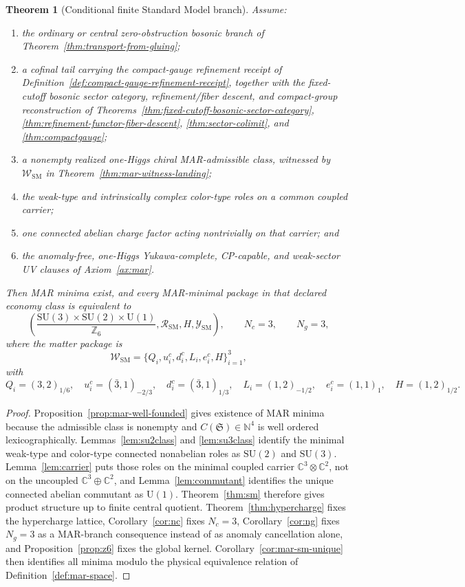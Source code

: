 \documentclass[11pt]{article}
\newtheorem{theorem}{Theorem}[section]
\newcommand{\SU}{\mathrm{SU}}
\newcommand{\U}{\mathrm{U}}
\begin{document}
\begin{theorem}[Conditional finite Standard Model branch]\label{thm:realized-sm-branch}
Assume:
\begin{enumerate}[label=\textup{(\arabic*)},leftmargin=2em]
\item the ordinary or central zero-obstruction bosonic branch of
Theorem~\ref{thm:transport-from-gluing};
\item a cofinal tail carrying the compact-gauge refinement receipt of
Definition~\ref{def:compact-gauge-refinement-receipt}, together with the fixed-cutoff bosonic sector category, refinement/fiber descent, and compact-group
reconstruction of Theorems~\ref{thm:fixed-cutoff-bosonic-sector-category},
\ref{thm:refinement-functor-fiber-descent}, \ref{thm:sector-colimit}, and
\ref{thm:compactgauge};
\item a nonempty realized one-Higgs chiral MAR-admissible class, witnessed by
\(\mathcal W_{\mathrm{SM}}\) in Theorem~\ref{thm:mar-witness-landing};
\item the weak-type and intrinsically complex color-type roles on a common coupled carrier;
\item one connected abelian charge factor acting nontrivially on that carrier; and
\item the anomaly-free, one-Higgs Yukawa-complete, CP-capable, and weak-sector UV clauses of
Axiom~\ref{ax:mar}.
\end{enumerate}
Then MAR minima exist, and every MAR-minimal package in that declared economy class is
equivalent to
\[
\left(
\frac{\SU(3)\times\SU(2)\times\U(1)}{\mathbb Z_6},
\mathcal R_{\mathrm{SM}},
H,
\mathcal Y_{\mathrm{SM}}
\right),
\qquad
N_c=3,\qquad N_g=3,
\]
where the matter package is
\[
\mathcal W_{\mathrm{SM}}
=
\{Q_i,u_i^c,d_i^c,L_i,e_i^c,H\}_{i=1}^{3},
\]
with
\[
Q_i=(3,2)_{1/6},\quad
u_i^c=(\bar 3,1)_{-2/3},\quad
d_i^c=(\bar 3,1)_{1/3},\quad
L_i=(1,2)_{-1/2},\quad
e_i^c=(1,1)_1,\quad
H=(1,2)_{1/2}.
\]
\end{theorem}

\begin{proof}
Proposition~\ref{prop:mar-well-founded} gives existence of MAR minima because the admissible
class is nonempty and \(C(\mathfrak S)\in\mathbb N^4\) is well ordered lexicographically.
Lemmas~\ref{lem:su2class} and \ref{lem:su3class} identify the minimal weak-type and color-type
connected nonabelian roles as \(\SU(2)\) and \(\SU(3)\). Lemma~\ref{lem:carrier} puts those roles
on the minimal coupled carrier \(\mathbb C^3\otimes\mathbb C^2\), not on the uncoupled
\(\mathbb C^3\oplus\mathbb C^2\), and Lemma~\ref{lem:commutant} identifies the unique connected
abelian commutant as \(\U(1)\). Theorem~\ref{thm:sm} therefore gives product structure up to
finite central quotient. Theorem~\ref{thm:hypercharge} fixes the hypercharge lattice,
Corollary~\ref{cor:nc} fixes \(N_c=3\), Corollary~\ref{cor:ng} fixes \(N_g=3\) as a
MAR-branch consequence instead of as anomaly cancellation alone, and Proposition~\ref{prop:z6}
fixes the global kernel. Corollary~\ref{cor:mar-sm-unique} then identifies all minima modulo
the physical equivalence relation of Definition~\ref{def:mar-space}.
\end{proof}
\end{document}
